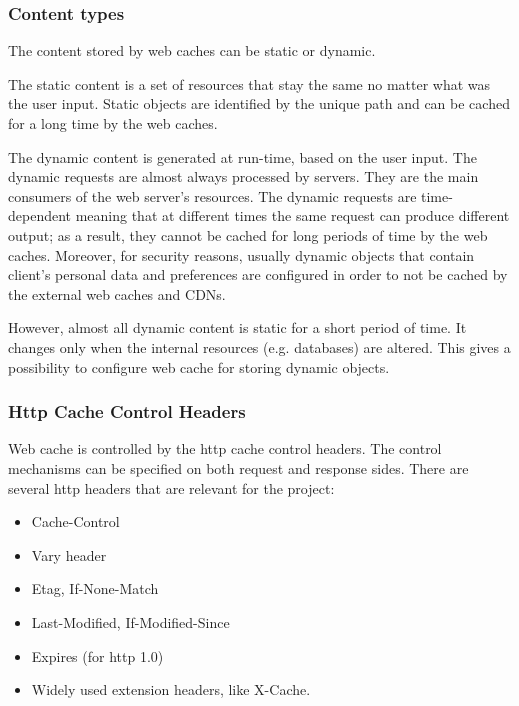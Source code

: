 \subsubsection{Content types}


The content stored by web caches can be static or dynamic.

The static content is a set of resources that stay the same no matter what was the user input. Static objects are identified by the unique path and can be cached for a long time by the web caches.

The dynamic content is generated at run-time, based on the user input\cite{DynamicWebCaching}. The dynamic requests are almost always processed by servers. They are the main consumers of the web server's resources. The dynamic requests are time-dependent meaning that at different times the same request can produce different output; as a result, they cannot be cached for long periods of time by the web caches. Moreover, for security reasons, usually dynamic objects that contain client's personal data and preferences are configured in order to not be cached by the external web caches and CDNs.

However, almost all dynamic content is static for a short period of time. It changes only when the internal resources (e.g. databases) are altered. This gives a possibility to configure web cache for storing dynamic objects.

\subsubsection{Http Cache Control Headers}

Web cache is controlled by the http cache control headers\cite{RFC7234}. The control mechanisms can be specified on both request and response sides. There are several http headers that are relevant for the project: 
\begin{itemize}
    \item Cache-Control
    \item Vary header
    \item Etag, If-None-Match
    \item Last-Modified, If-Modified-Since
    \item Expires (for http 1.0)
    \item Widely used extension headers, like X-Cache.
\end{itemize}

